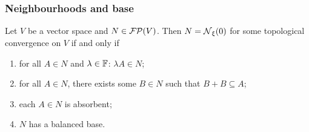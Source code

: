 \subsubsection{Neighbourhoods and base}
\begin{proposition} \label{TVSconstruction}
Let $V$ be a vector space and $N\in\operatorname{\mathcal{FP}}(V)$. Then $N = \operatorname{\mathcal{N}}_\xi(0)$ for some topological convergence on $V$ \textup{if and only if}
\begin{enumerate}
\item for all $A\in N$ and $\lambda\in \mathbb{F}$: $\lambda A\in N$;
\item for all $A\in N$, there exists some $B\in N$ such that $B+B\subseteq A$;
\item each $A \in N$ is absorbent;
\item $N$ has a balanced base.
\end{enumerate}
\end{proposition}
